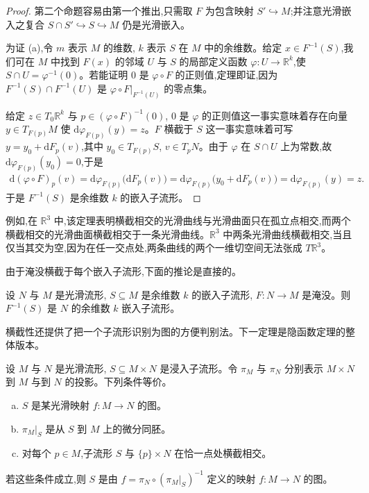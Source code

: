 \documentclass[../../main.tex]{subfiles}
\begin{document}
\begin{proof}
第二个命题容易由第一个推出,只需取 $F$ 为包含映射 $S'\hookrightarrow M$;并注意光滑嵌入之复合 $S\cap S'\hookrightarrow S\hookrightarrow M$ 仍是光滑嵌入。

为证 (a),令 $m$ 表示 $M$ 的维数, $k$ 表示 $S$ 在 $M$ 中的余维数。给定 $x\in F^{-1}(S)$,我们可在 $M$ 中找到 $F(x)$ 的邻域 $U$ 与 $S$ 的局部定义函数 $\varphi:U\to\mathbb{R}^k$,使 $S\cap U=\varphi^{-1}(0)$。若能证明 $0$ 是 $\varphi\circ F$ 的正则值,定理即证,因为 $F^{-1}(S)\cap F^{-1}(U)$ 是 $\varphi\circ F|_{F^{-1}(U)}$ 的零点集。

给定 $z\in T_0\mathbb{R}^k$ 与 $p\in(\varphi\circ F)^{-1}(0)$, $0$ 是 $\varphi$ 的正则值这一事实意味着存在向量 $y\in T_{F(p)}M$ 使 $\mathrm{d}\varphi_{F(p)}(y)=z$。$F$ 横截于 $S$ 这一事实意味着可写 $y=y_0+\mathrm{d}F_p(v)$,其中 $y_0\in T_{F(p)}S$, $v\in T_pN$。由于 $\varphi$ 在 $S\cap U$ 上为常数,故 $\mathrm{d}\varphi_{F(p)}(y_0)=0$,于是
\begin{align*}
\mathrm{d}(\varphi\circ F)_p(v)=\mathrm{d}\varphi_{F(p)}\bigl(\mathrm{d}F_p(v)\bigr)
=\mathrm{d}\varphi_{F(p)}\bigl(y_0+\mathrm{d}F_p(v)\bigr)
=\mathrm{d}\varphi_{F(p)}(y)=z.
\end{align*}
于是 $F^{-1}(S)$ 是余维数 $k$ 的嵌入子流形。
\end{proof}

例如,在 $\mathbb{R}^3$ 中,该定理表明横截相交的光滑曲线与光滑曲面只在孤立点相交,而两个横截相交的光滑曲面横截相交于一条光滑曲线。$\mathbb{R}^3$ 中两条光滑曲线横截相交,当且仅当其交为空,因为在任一交点处,两条曲线的两个一维切空间无法张成 $T\mathbb{R}^3$。

由于淹没横截于每个嵌入子流形,下面的推论是直接的。

\begin{corollary}\label{corollary:ch06-submersion-preimage-transverse}
设 $N$ 与 $M$ 是光滑流形, $S\subseteq M$ 是余维数 $k$ 的嵌入子流形, $F:N\to M$ 是淹没。则 $F^{-1}(S)$ 是 $N$ 的余维数 $k$ 嵌入子流形。
\end{corollary}

横截性还提供了把一个子流形识别为图的方便判别法。下一定理是隐函数定理的整体版本。

\begin{theorem}\label{theorem:ch06-global-graph}
设 $M$ 与 $N$ 是光滑流形, $S\subseteq M\times N$ 是浸入子流形。令 $\pi_M$ 与 $\pi_N$ 分别表示 $M\times N$ 到 $M$ 与到 $N$ 的投影。下列条件等价。
\begin{enumerate}[(a)]
\item $S$ 是某光滑映射 $f:M\to N$ 的图。
\item $\pi_M|_S$ 是从 $S$ 到 $M$ 上的微分同胚。
\item 对每个 $p\in M$,子流形 $S$ 与 $\{p\}\times N$ 在恰一点处横截相交。
\end{enumerate}
若这些条件成立,则 $S$ 是由 $f=\pi_N\circ(\pi_M|_S)^{-1}$ 定义的映射 $f:M\to N$ 的图。
\end{theorem}
\end{document}
